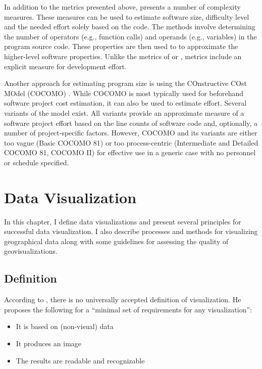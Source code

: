 In addition to the metrics presented above, \citet{halstead_elements_1977} presents a number of complexity measures. These measures can be used to estimate software size, difficulty level and the needed effort solely based on the code. The methods involve determining the number of operators (e.g., function calls) and operands (e.g., variables) in the program source code. These properties are then used to to approximate the higher-level software properties. Unlike the metrics of \citeauthor{mccabe_complexity_1976} or \citeauthor{fenton_software_1998}, \citeauthor{halstead_elements_1977} metrics include an explicit measure for development effort.

Another approach for estimating program size is using the COnstructive COst MOdel (COCOMO) \citep{boehm_software_1981}. While COCOMO is most typically used for beforehand software project cost estimation, it can also be used to estimate effort. Several variants of the model exist. All variants provide an approximate measure of a software project effort based on the line counts of software code and, optionally, a number of project-specific factors. However, COCOMO and its variants are either too vague (Basic COCOMO 81) or too process-centric (Intermediate and Detailed COCOMO 81, COCOMO II) for effective use in a generic case with no personnel or schedule specified.

\chapter{Data Visualization}
\label{chapter:dataviz}

In this chapter, I define data visualizations and present several principles for successful data visualization. I also describe processes and methods for visualizing geographical data along with some guidelines for assessing the quality of geovisualizations.

\section{Definition}

According to \citet[chap.~3]{kosara_visualization_2007}, there is no universally accepted definition of visualization. He proposes the following for a ``minimal set of requirements for any visualization'':

\begin{itemize}
	\item It is based on (non-visual) data
	\item It produces an image
	\item The results are readable and recognizable
\end{itemize}


